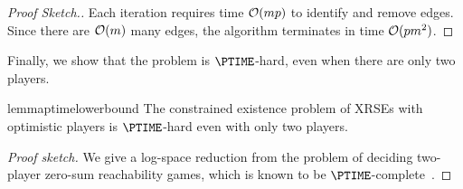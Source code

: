 \begin{proof}[Proof Sketch.]
    Each iteration requires time $\mathcal{O}(mp)$ to identify and remove edges.
    Since there are $\mathcal{O}(m)$ many edges, the algorithm terminates in time $\mathcal{O}(pm^2)$.
\end{proof}

Finally, we show that the problem is $\PTIME$-hard, even when there are only two players.

\begin{restatable}{lemma}{ptimelowerbound}\label{lm:ptimelowerbound}
    The constrained existence problem of XRSEs with optimistic players is $\PTIME$-hard even with only two players.
\end{restatable}

\begin{proof}[Proof sketch]
    We give a log-space reduction from the problem of deciding two-player zero-sum reachability games, which is known to be $\PTIME$-complete~\cite[Proposition~6]{Imm81}.
\end{proof}
